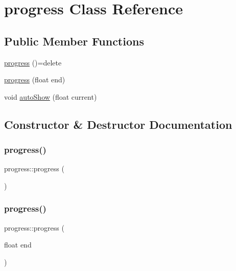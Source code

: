 \hypertarget{classprogress}{}\section{progress Class Reference}
\label{classprogress}
\subsection*{Public Member Functions}
\begin{DoxyCompactItemize}
\item 
\mbox{\hyperlink{classprogress_a50c7c9309a9d3e65b369810508294748}{progress}} ()=delete
\item 
\mbox{\hyperlink{classprogress_a0ef959538c5639e51421f0f365395f05}{progress}} (float end)
\item 
void \mbox{\hyperlink{classprogress_a9abf6cad4ec787f0f886469b3fac058a}{auto\+Show}} (float current)
\end{DoxyCompactItemize}


\subsection{Constructor \& Destructor Documentation}
\mbox{\label{classprogress_a50c7c9309a9d3e65b369810508294748}} 
\subsubsection{\texorpdfstring{progress()}{progress()}\hspace{0.1cm}{\footnotesize\ttfamily [1/2]}}
{\footnotesize\ttfamily progress\+::progress (\begin{DoxyParamCaption}{ }\end{DoxyParamCaption})\hspace{0.3cm}{\ttfamily [delete]}}

\mbox{\label{classprogress_a0ef959538c5639e51421f0f365395f05}} 
\subsubsection{\texorpdfstring{progress()}{progress()}\hspace{0.1cm}{\footnotesize\ttfamily [2/2]}}
{\footnotesize\ttfamily progress\+::progress (\begin{DoxyParamCaption}\item[{float}]{end }\end{DoxyParamCaption})\hspace{0.3cm}{\ttfamily [inline]}}



